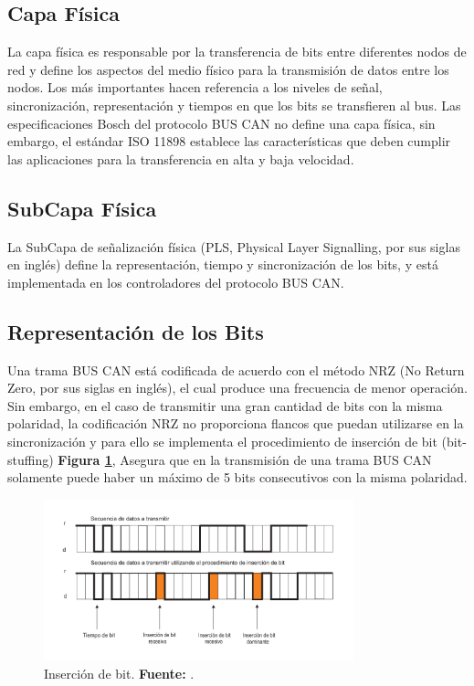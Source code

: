 \subsection  {Capa Física}

La capa física es responsable por la transferencia de bits entre diferentes nodos de red y define los aspectos del medio físico para la transmisión de datos entre los nodos. Los más importantes hacen referencia a los niveles de señal, sincronización, representación y tiempos en que los bits se transfieren al bus. 
Las especificaciones Bosch del protocolo BUS CAN no define una capa física, sin embargo, el estándar  ISO 11898 establece las características que deben cumplir las aplicaciones para la transferencia en alta y baja velocidad.
 
\subsection{SubCapa Física}

La SubCapa de señalización física (PLS, Physical Layer Signalling, por sus siglas en inglés) define la representación, tiempo y sincronización de los bits, y está implementada en los controladores del protocolo BUS CAN.


\subsection{Representación de los Bits}

Una trama BUS CAN está codificada de acuerdo con el método NRZ (No Return Zero, por sus siglas en inglés), el cual produce una frecuencia de menor operación. Sin embargo, en el caso de transmitir una gran cantidad de bits con la misma polaridad, la codificación NRZ no proporciona flancos que puedan utilizarse en la sincronización y para ello se implementa el procedimiento de inserción de bit (bit-stuffing) \textbf{Figura \ref{IB}}, Asegura que en la transmisión de una trama BUS CAN solamente puede haber un máximo de 5 bits consecutivos con la misma polaridad.



\begin{figure}[H]
	\centering
		\includegraphics[width=0.8\textwidth]{./Cap2imagen/insercionbit.pdf}
	\caption[Inserción de bit.]{Inserción de bit.\textbf{ Fuente:} \cite{DSEEPC}.}
	\label{IB} %
\end{figure}

